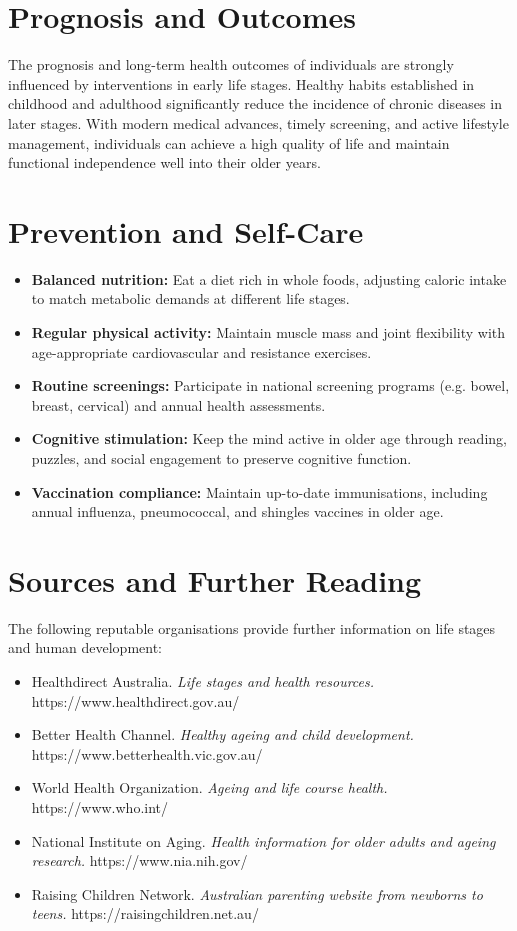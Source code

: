 \section*{Prognosis and Outcomes}
The prognosis and long-term health outcomes of individuals are strongly influenced by interventions in early life stages. Healthy habits established in childhood and adulthood significantly reduce the incidence of chronic diseases in later stages. With modern medical advances, timely screening, and active lifestyle management, individuals can achieve a high quality of life and maintain functional independence well into their older years.

\section*{Prevention and Self-Care}
\begin{itemize}
    \item \textbf{Balanced nutrition:} Eat a diet rich in whole foods, adjusting caloric intake to match metabolic demands at different life stages.
    \item \textbf{Regular physical activity:} Maintain muscle mass and joint flexibility with age-appropriate cardiovascular and resistance exercises.
    \item \textbf{Routine screenings:} Participate in national screening programs (e.g. bowel, breast, cervical) and annual health assessments.
    \item \textbf{Cognitive stimulation:} Keep the mind active in older age through reading, puzzles, and social engagement to preserve cognitive function.
    \item \textbf{Vaccination compliance:} Maintain up-to-date immunisations, including annual influenza, pneumococcal, and shingles vaccines in older age.
\end{itemize}

\section*{Sources and Further Reading}
The following reputable organisations provide further information on life stages and human development:
\begin{itemize}
    \item Healthdirect Australia. \textit{Life stages and health resources.} https://www.healthdirect.gov.au/
    \item Better Health Channel. \textit{Healthy ageing and child development.} https://www.betterhealth.vic.gov.au/
    \item World Health Organization. \textit{Ageing and life course health.} https://www.who.int/
    \item National Institute on Aging. \textit{Health information for older adults and ageing research.} https://www.nia.nih.gov/
    \item Raising Children Network. \textit{Australian parenting website from newborns to teens.} https://raisingchildren.net.au/
\end{itemize}

